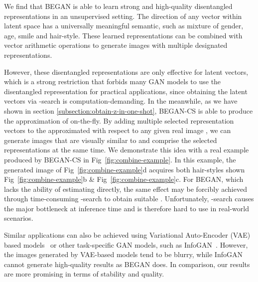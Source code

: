 \documentclass[runningheads]{llncs}
\begin{document}
    We find that BEGAN is able to learn strong and high-quality disentangled representations in an unsupervised setting. The direction of any vector within latent space  has a universally meaningful semantic, such as mixture of gender, age, smile and hair-style. These learned representations can be combined with vector arithmetic operations to generate images with multiple designated representations.
    
    However, these disentangled representations are only effective for latent vectors, which is a strong restriction that forbids many GAN models to use the disentangled representation for practical applications, since obtaining the latent vectors via -search is computation-demanding. In the meanwhile, as we have shown in section \ref{subsection:obtain-z-in-one-shot}, BEGAN-CS is able to produce the approximation of  on-the-fly. By adding multiple selected representation vectors to the approximated  with respect to any given real image , we can generate images that are visually similar to  and comprise the selected representations at the same time. We demonstrate this idea with a real example produced by BEGAN-CS in Fig~\ref{fig:combine-example}. In this example, the generated image of Fig~\ref{fig:combine-example}d acquires both hair-styles shown Fig~\ref{fig:combine-example}b \& Fig~\ref{fig:combine-example}c. For BEGAN, which lacks the ability of estimating  directly, the same effect may be forcibly achieved through time-consuming -search to obtain suitable . Unfortunately, -search causes the major bottleneck at inference time and is therefore hard to use in real-world scenarios.
    
    Similar applications can also be achieved using Variational Auto-Encoder (VAE) based models~\cite{VAE,beta-VAE,VAE-GAN} or other task-specific GAN models, such as InfoGAN~\cite{info-GANs}. However, the images generated by VAE-based models tend to be blurry, while InfoGAN cannot generate high-quality results as BEGAN does. In comparison, our results are more promising in terms of stability and quality.
    
\end{document}

